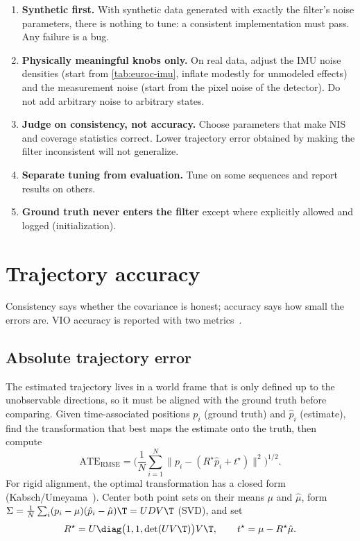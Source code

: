 \begin{enumerate}
  \item \textbf{Synthetic first.} With synthetic data generated with exactly the filter's noise parameters, there is
        nothing to tune: a consistent implementation must pass. Any failure is a bug.
  \item \textbf{Physically meaningful knobs only.} On real data, adjust the IMU noise densities (start from
        \cref{tab:euroc-imu}, inflate modestly for unmodeled effects) and the measurement noise (start from the pixel
        noise of the detector). Do not add arbitrary noise to arbitrary states.
  \item \textbf{Judge on consistency, not accuracy.} Choose parameters that make NIS and coverage statistics correct.
        Lower trajectory error obtained by making the filter inconsistent will not generalize.
  \item \textbf{Separate tuning from evaluation.} Tune on some sequences and report results on others.
  \item \textbf{Ground truth never enters the filter} except where explicitly allowed and logged (initialization).
\end{enumerate}

\section{Trajectory accuracy}

Consistency says whether the covariance is honest; accuracy says how small the errors are. VIO accuracy is
reported with two metrics~\cite{sturm2012tum, zhang2018tutorial}.

\subsection{Absolute trajectory error}

The estimated trajectory lives in a world frame that is only defined up to the unobservable directions, so it must
be aligned with the ground truth before comparing. Given time-associated positions $p_i$ (ground truth) and
$\hat p_i$ (estimate), find the transformation that best maps the estimate onto the truth, then compute
\begin{equation}
  \mathrm{ATE}_{\mathrm{RMSE}} = \Big(\frac1N\sum_{i=1}^N\big\|p_i - (R^\star\hat p_i + t^\star)\big\|^2\Big)^{1/2}.
\end{equation}
For rigid alignment, the optimal transformation has a closed form (Kabsch/Umeyama~\cite{umeyama1991}). Center both
point sets on their means $\mu$ and $\hat\mu$, form $\Sigma = \frac1N\sum_i(p_i - \mu)(\hat p_i - \hat\mu)\T = UDV\T$ (SVD), and set
\begin{equation}
  R^\star = U\diag\big(1, 1, \det(UV\T)\big)V\T, \qquad t^\star = \mu - R^\star\hat\mu .
\end{equation}

